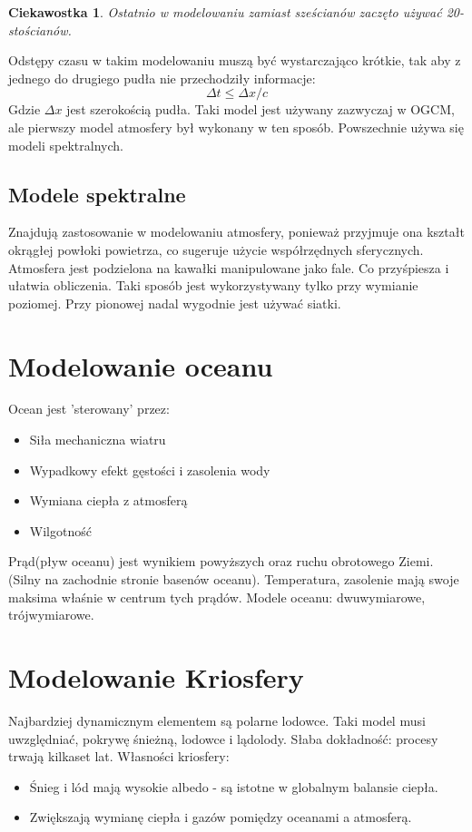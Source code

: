 \documentclass{article}
\theoremstyle{plain}
\newtheorem{ciekaw}{Ciekawostka}
\begin{document}
\begin{ciekaw}
	Ostatnio w modelowaniu zamiast sześcianów zaczęto używać 20-stościanów.
\end{ciekaw}
Odstępy czasu w takim modelowaniu muszą być wystarczająco krótkie, tak aby z jednego do drugiego pudła nie przechodziły informacje:
\begin{equation}
	\Delta t \le \Delta x/c
\end{equation}
Gdzie $\Delta x$ jest szerokością pudła. 
Taki model jest używany zazwyczaj w OGCM, ale pierwszy model atmosfery był wykonany w ten sposób. Powszechnie używa się modeli spektralnych.
\subsection{Modele spektralne}
	Znajdują zastosowanie w modelowaniu atmosfery, ponieważ przyjmuje ona kształt okrągłej powłoki powietrza, co sugeruje użycie współrzędnych sferycznych.
	Atmosfera jest podzielona na kawałki manipulowane jako fale. Co przyśpiesza i ułatwia obliczenia. Taki sposób jest wykorzystywany tylko przy wymianie poziomej. Przy pionowej nadal wygodnie jest używać siatki.  



\section{Modelowanie oceanu}
	Ocean jest 'sterowany' przez:
	\begin{itemize}
		\item Siła mechaniczna wiatru
		\item Wypadkowy efekt gęstości i zasolenia wody
		\item Wymiana ciepła z atmosferą
		\item Wilgotność
	\end{itemize}
Prąd(pływ oceanu) jest wynikiem powyższych oraz ruchu obrotowego Ziemi.(Silny na zachodnie stronie basenów oceanu). Temperatura, zasolenie mają swoje maksima właśnie w centrum tych prądów. 
Modele oceanu: dwuwymiarowe, trójwymiarowe.

\section{Modelowanie Kriosfery}
Najbardziej dynamicznym elementem są polarne lodowce. Taki model musi uwzględniać, pokrywę śnieżną, lodowce i lądolody. Słaba dokładność: procesy trwają kilkaset lat.
Własności kriosfery:
\begin{itemize}
	\item Śnieg i lód mają wysokie albedo - są istotne w globalnym balansie ciepła. 
	\item Zwiększają wymianę ciepła i gazów pomiędzy oceanami a atmosferą.
\end{itemize}
\end{document}
